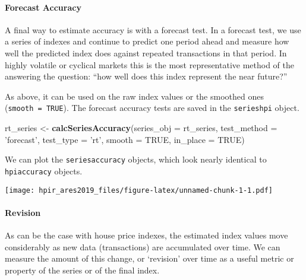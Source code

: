 \documentclass[]{article}
\newenvironment{Shaded}{\begin{snugshade}}{\end{snugshade}}
\newcommand{\KeywordTok}[1]{\textcolor[rgb]{0.13,0.29,0.53}{\textbf{#1}}}
\newcommand{\DataTypeTok}[1]{\textcolor[rgb]{0.13,0.29,0.53}{#1}}
\newcommand{\StringTok}[1]{\textcolor[rgb]{0.31,0.60,0.02}{#1}}
\newcommand{\OtherTok}[1]{\textcolor[rgb]{0.56,0.35,0.01}{#1}}
\newcommand{\OperatorTok}[1]{\textcolor[rgb]{0.81,0.36,0.00}{\textbf{#1}}}
\newcommand{\NormalTok}[1]{#1}
\let\oldparagraph\paragraph
\renewcommand{\paragraph}[1]{\oldparagraph{#1}\mbox{}}
\begin{document}
\paragraph{Forecast Accuracy}\label{forecast-accuracy}

A final way to estimate accuracy is with a forecast test. In a forecast
test, we use a series of indexes and continue to predict one period
ahead and measure how well the predicted index does against repeated
transactions in that period. In highly volatile or cyclical markets this
is the most representative method of the answering the question: ``how
well does this index represent the near future?''

As above, it can be used on the raw index values or the smoothed ones
(\texttt{smooth\ =\ TRUE}). The forecast accuracy tests are saved in the
\texttt{serieshpi} object.

\begin{Shaded}
\begin{Highlighting}[]
\NormalTok{  rt_series <-}\StringTok{ }\KeywordTok{calcSeriesAccuracy}\NormalTok{(}\DataTypeTok{series_obj =}\NormalTok{ rt_series,}
                                  \DataTypeTok{test_method =} \StringTok{'forecast'}\NormalTok{,}
                                  \DataTypeTok{test_type =} \StringTok{'rt'}\NormalTok{,}
                                  \DataTypeTok{smooth =} \OtherTok{TRUE}\NormalTok{,}
                                  \DataTypeTok{in_place =} \OtherTok{TRUE}\NormalTok{)}
\end{Highlighting}
\end{Shaded}

We can plot the \texttt{seriesaccuracy} objects, which look nearly
identical to \texttt{hpiaccuracy} objects.

\begin{Shaded}
\end{Shaded}

\texttt{[image: hpir\_ares2019\_files/figure-latex/unnamed-chunk-1-1.pdf]}

\paragraph{Revision}\label{revision}

As can be the case with house price indexes, the estimated index values
move considerably as new data (transactions) are accumulated over time.
We can measure the amount of this change, or `revision' over time as a
useful metric or property of the series or of the final index.
\end{document}
